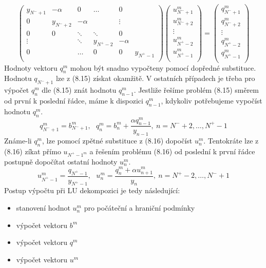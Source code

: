 \documentclass[a4paper]{book}
\begin{document}
\begin{equation}
	\begin{pmatrix}
		y_{N^{-} + 1} &  -\alpha & 0 & \dots & 0 \\
		0 & y_{N^{-} + 2} & -\alpha & & \vdots \\
		0 & 0 & \ddots & \ddots & 0 \\
		\vdots & & \ddots & y_{N^{+} -2} & -\alpha \\
		0 & & \dots & 0 & 0 & y_{N^{+} - 1} \\
	\end{pmatrix}
	\begin{pmatrix}
		u_{N^{-}+1}^m \\
		u_{N^{-}+2}^m \\
		\vdots \\
		u_{N^{+}-2}^m \\
		u_{N^{+}-1}^m \\
	\end{pmatrix}
	=
	\begin{pmatrix}
		q_{N^{-} + 1}^m \\
		q_{N^{-} + 2}^m \\
		\vdots \\
		q_{N^{+} - 2}^m \\
		q_{N^{+} - 1}^m \\
	\end{pmatrix}
\end{equation}
Hodnoty vektoru $q_n^m$ mohou být snadno vypočteny pomocí dopředné substituce. Hodnotu $q_{N^{-}+1}$ lze z (8.15) získat okamžitě. V ostatních případech je třeba pro výpočet $q_n^m$ dle (8.15) znát hodnotu $q_{n-1}^m$. Jestliže řešíme problém (8.15) směrem od první k poslední řádce, máme k dispozici $q_{n-1}^m$, kdykoliv potřebujeme vypočíst hodnotu $q_{n}^m$.
\begin{equation*}
q_{N^{-}+1}^m = b_{N^{-}+1}^m,~~~q_n^m = b_n^m + \frac{\alpha q_{n-1}^m}{y_{n-1}}, ~ n = N^{-}+2, \dots, N^{+}-1
\end{equation*}
Známe-li $q_n^m$, lze pomocí zpětné substituce z (8.16) dopočíst $u_n^m$. Tentokráte lze z (8.16) zíkat přímo $u_{N^{+}-1^m}$ a řešením problému (8.16) od poslední k první řádce postupně dopočítat ostatní hodnoty $u_n^m$.
\begin{equation*}
u_{N^{+}-1}^m = \frac{q_{N^{+}-1}}{y_{N^{+}-1}},~~~u_n^m = \frac{q_n^m + \alpha u_{n+1}^m}{y_n}, ~ n = N^{+}-2, \dots, N^{-} + 1 
\end{equation*}
Postup výpočtu při LU dekompozici je tedy následující:
\begin{itemize}
\item stanovení hodnot $u_n^m$ pro počáteční a hraniční podmínky
\item výpočet vektoru $b^m$
\item výpočet vektoru $q^m$
\item výpočet vektoru $u^m$
\end{itemize}
\end{document}
